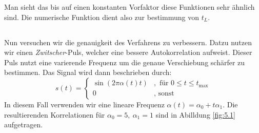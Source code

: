 \documentclass[ngerman]{scrartcl}
\begin{document}
Man sieht das bis auf einen konstanten Vorfaktor diese Funktionen sehr \"ahnlich sind.
Die numerische Funktion dient also zur bestimmung von $t_L$.
\subsection{}
Nun versuchen wir die genauigkeit des Verfahrens zu verbessern.
Datzu nutzen wir einen \emph{Zwitscher}-Puls, welcher eine bessere Autokorrelation aufweist.
Dieser Puls nutzt eine varierende Frequenz um die genaue Verschiebung sch\"arfer zu bestimmen.
Das Signal wird dann beschrieben durch:
\begin{equation*}
s(t)=\left\{\begin{array}{ll}
\sin (2 \pi \alpha(t) t)&,\text { für } 0 \leq t \leq t_{\max } \\
0& ,\text { sonst }
\end{array}\right.
\end{equation*}
In diesem Fall verwenden wir eine lineare Frequenz $\alpha(t)=\alpha_0+t\alpha_1$.
Die resultierenden Korrelationen f\"ur $\alpha_0=5,~\alpha_1=1$ sind in Abilldung \ref{fig:5.1} aufgetragen.
\end{document}
